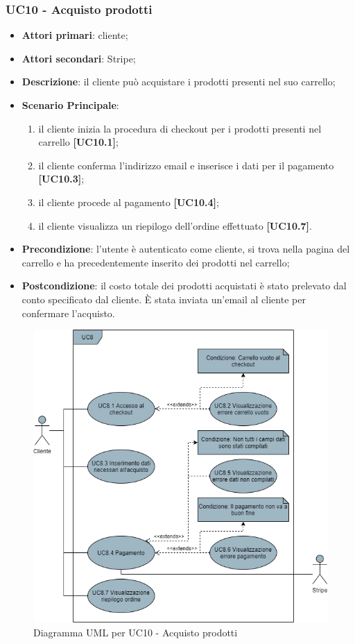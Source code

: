 \subsubsection{UC10 - Acquisto prodotti}
\begin{itemize}
\item \textbf{Attori primari}: cliente;
\item \textbf{Attori secondari}: Stripe;
\item \textbf{Descrizione}: il cliente può acquistare i prodotti presenti nel suo carrello;
\item \textbf{Scenario Principale}: 
\begin{enumerate}
	\item il cliente inizia la procedura di checkout per i prodotti presenti nel carrello \textbf{[UC10.1]};
	\item il cliente conferma l'indirizzo email e inserisce i dati per il pagamento \textbf{[UC10.3]};
	\item il cliente procede al pagamento \textbf{[UC10.4]};
	\item il cliente visualizza un riepilogo dell'ordine effettuato \textbf{[UC10.7]}.
\end{enumerate}
\item \textbf{Precondizione}: l'utente è autenticato come cliente, si trova nella pagina del carrello e ha precedentemente inserito dei prodotti nel carrello;
\item \textbf{Postcondizione}: il costo totale dei prodotti acquistati è stato prelevato dal conto specificato dal cliente. È stata inviata un'email al cliente per confermare l'acquisto.
\end{itemize}

\begin{figure}[H]
\centering
\includegraphics[scale=0.6]{res/UseCase/Immagini/AcquistoProdotti}
\caption{Diagramma UML per UC10 - Acquisto prodotti}
\end{figure}

